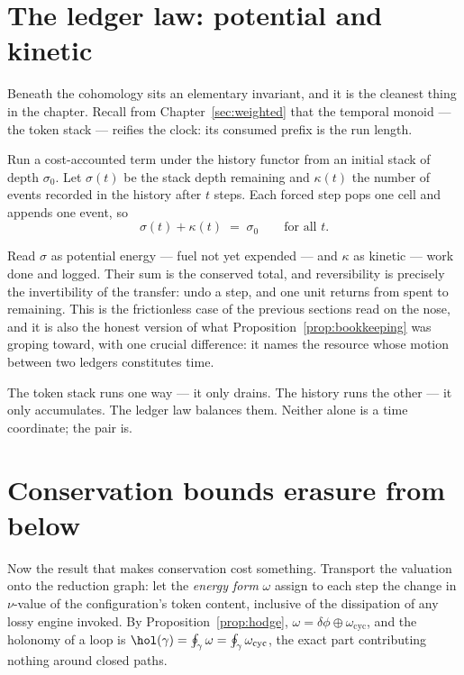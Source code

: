 \section{The ledger law: potential and kinetic}

Beneath the cohomology sits an elementary invariant, and it is the
cleanest thing in the chapter.  Recall from Chapter~\ref{sec:weighted}
that the temporal monoid --- the token stack --- reifies the clock: its
consumed prefix is the run length.

\begin{proposition}
\label{thm:conservation}
Run a cost-accounted term under the history functor from an initial stack
of depth $\sigma_0$.  Let $\sigma(t)$ be the stack depth remaining and
$\kappa(t)$ the number of events recorded in the history after $t$ steps.
Each forced step pops one cell and appends one event, so
\[
  \sigma(t) + \kappa(t) \;=\; \sigma_0 \qquad \text{for all } t.
\]
\end{proposition}

Read $\sigma$ as potential energy --- fuel not yet expended --- and
$\kappa$ as kinetic --- work done and logged.  Their sum is the conserved
total, and reversibility is precisely the invertibility of the transfer:
undo a step, and one unit returns from spent to remaining.  This is the
frictionless case of the previous sections read on the nose, and it is
also the honest version of what Proposition~\ref{prop:bookkeeping} was
groping toward, with one crucial difference: it names the resource whose
motion between two ledgers constitutes time.

\begin{remark}
The token stack runs one way --- it only drains.  The history runs the
other --- it only accumulates.  The ledger law balances them.  Neither
alone is a time coordinate; the pair is.
\end{remark}

\section{Conservation bounds erasure from below}
\label{sec:erasurebound}

Now the result that makes conservation cost something.  Transport the
valuation onto the reduction graph: let the \emph{energy form} $\omega$
assign to each step the change in $\nu$-value of the configuration's token
content, inclusive of the dissipation of any lossy engine invoked.  By
Proposition~\ref{prop:hodge}, $\omega = \delta\phi \oplus
\omega_{\mathrm{cyc}}$, and the holonomy of a loop is
$\hol(\gamma) = \oint_\gamma \omega = \oint_\gamma \omega_{\mathrm{cyc}}$,
the exact part contributing nothing around closed paths.

